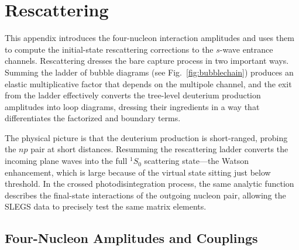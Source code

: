 \documentclass[
  aps,prd,twocolumn,nofootinbib,superscriptaddress,
  longbibliography,floatfix,preprintnumbers
]{revtex4-2}
\begin{document}
\appendix

\section{Rescattering}
\label{app:bubble}

This appendix introduces the four-nucleon interaction amplitudes and uses them to compute the initial-state rescattering corrections to the $s$-wave entrance channels.
Rescattering dresses the bare capture process in two important ways.  Summing the ladder of bubble diagrams (see Fig.~\ref{fig:bubblechain}) produces
an elastic multiplicative factor that depends on the multipole channel, and the exit from the ladder effectively converts the tree-level deuterium production amplitudes into loop diagrams,
dressing their ingredients in a way that differentiates the factorized and boundary terms.

The physical picture is that the deuterium production is short-ranged, probing the $np$ pair at short distances.  Resumming the rescattering ladder
converts the incoming plane waves into the full $^{1}S_{0}$ scattering state---the Watson enhancement, which is large because of the virtual
state sitting just below threshold. In the crossed photodisintegration process, the
same analytic function describes the final-state interactions of the outgoing nucleon pair, allowing the SLEGS data to precisely test the same matrix elements.

\subsection{Four-Nucleon Amplitudes and Couplings}
\label{app:nnamps}
\end{document}
